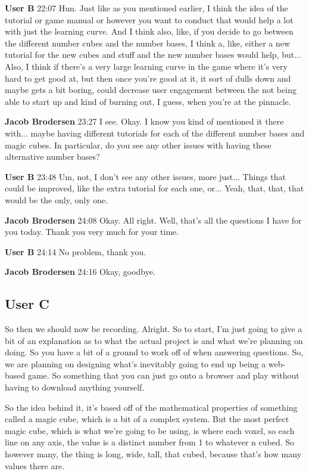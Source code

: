\documentclass{article}
\begin{document}
\noindent \textbf{User B}   22:07
Hun.
Just like as you mentioned earlier, I think the idea of the tutorial or game manual or however you want to conduct that would help a lot with just the learning curve.
And I think also, like, if you decide to go between the different number cubes and the number bases,
I think a, like, either a new tutorial for the new cubes and stuff and the new number bases would help, but...
Also, I think if there's a very large learning curve in the game where it's very hard to get good at, but then once you're good at it, it sort of dulls down and maybe gets a bit boring, could decrease user
engagement between the not being able to start up and kind of burning out, I guess, when you're at the pinnacle.

\noindent \textbf{Jacob Brodersen}   23:27
I see. Okay. I know you kind of mentioned it there with...
maybe having different tutorials for each of the different number bases and magic cubes. In particular, do you see any other issues with having these alternative number bases?

\noindent \textbf{User B}   23:48
Um, not, I don't see any other issues, more just...
Things that could be improved, like the extra tutorial for each one, or...
Yeah, that, that, that would be the only, only one.

\noindent \textbf{Jacob Brodersen}   24:08
Okay. All right. Well, that's all the questions I have for you today. Thank you very much for your time.

\noindent \textbf{User B}   24:14
No problem, thank you.

\noindent \textbf{Jacob Brodersen}   24:16
Okay, goodbye.

\subsection{User C}

So then we should now be recording. Alright. So to start, I'm just going to give a bit of an
explanation as to what the actual project is and what we're planning on doing.
So you have a bit of a ground to work off of when answering questions. So, we are planning on
designing what's inevitably going to end up being a web-based game. So something that you can
just go onto a browser and play without having to download anything yourself.

So the idea behind it, it's based off of the mathematical properties of something called a magic
cube, which is a bit of a complex system. But the most perfect magic cube, which is what we're
going to be using, is where each voxel, so each line on any axis, the value is a distinct number
from 1 to whatever n cubed. So however many, the thing is long, wide, tall, that cubed, because
that's how many values there are.
\end{document}
